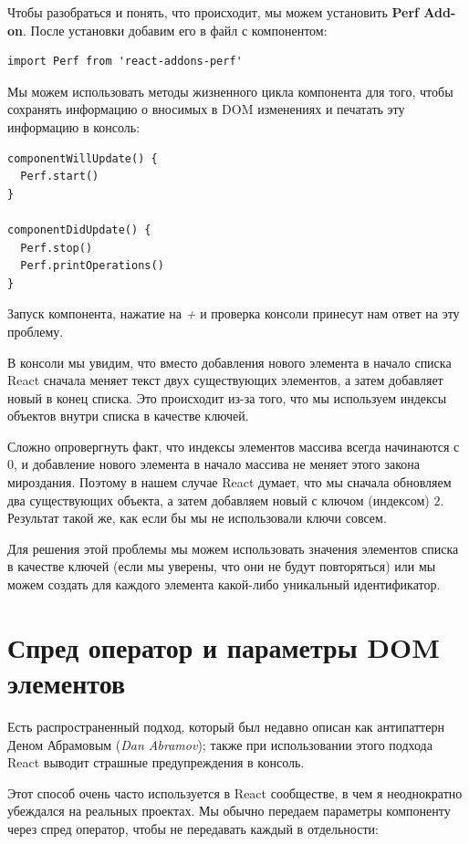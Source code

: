 Чтобы разобраться и понять, что происходит, мы можем установить \textbf{Perf Add-on}. После установки добавим его в файл с компонентом:

\begin{lstlisting}
import Perf from 'react-addons-perf'
\end{lstlisting}

Мы можем использовать методы жизненного цикла компонента для того, чтобы сохранять информацию о вносимых в DOM изменениях и печатать эту информацию в консоль:

\begin{lstlisting}
componentWillUpdate() {
  Perf.start()
}

componentDidUpdate() {
  Perf.stop()
  Perf.printOperations()
}
\end{lstlisting}

Запуск компонента, нажатие на \textit{+} и проверка консоли принесут нам ответ на эту проблему. 

В консоли мы увидим, что вместо добавления нового элемента в начало списка React сначала меняет текст двух существующих элементов, а затем добавляет новый в конец списка. Это происходит из-за того, что мы используем индексы объектов внутри списка в качестве ключей.

Сложно опровергнуть факт, что индексы элементов массива всегда начинаются с $0$, и добавление нового элемента в начало массива не меняет этого закона мироздания. Поэтому в нашем случае React думает, что мы сначала обновляем два существующих объекта, а затем добавляем новый с ключом (индексом) $2$. Результат такой же, как если бы мы не использовали ключи совсем.

Для решения этой проблемы мы можем использовать значения элементов списка в качестве ключей (если мы уверены, что они не будут повторяться) или мы можем создать для каждого элемента какой-либо уникальный идентификатор.

\section{Спред оператор и параметры DOM элементов}

Есть распространенный подход, который был недавно описан как антипаттерн Деном Абрамовым (\textit{Dan Abramov}); также при использовании этого подхода React выводит страшные предупреждения в консоль.

Этот способ очень часто используется в React сообществе, в чем я неоднократно убеждался на реальных проектах. Мы обычно передаем параметры компоненту через спред оператор, чтобы не передавать каждый в отдельности:

